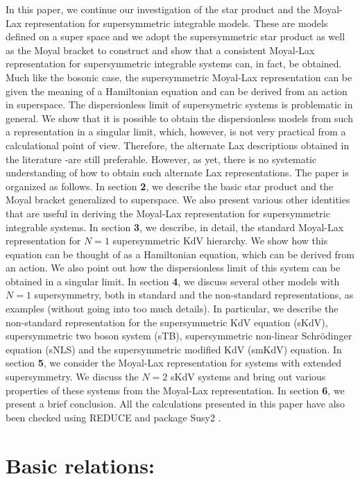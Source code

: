 \documentclass[a4paper,11pt]{article}
\begin{document}
In this paper, we continue our investigation of the star product and
the Moyal-Lax representation for supersymmetric integrable
models. These are models defined on a super space \cite{14} and we adopt the
supersymmetric star product \cite{15} as well as the Moyal bracket to
construct and show that a consistent Moyal-Lax representation for
supersymmetric
integrable systems can, in fact, be obtained. Much like the bosonic
case, the supersymmetric Moyal-Lax representation can be given the
meaning of a Hamiltonian equation and can be derived from an action in
superspace. The dispersionless limit of supersymetric systems is
problematic in general. We show that it is possible to obtain the
dispersionless models from such a representation in a singular limit,
which, however, is not very practical from a calculational point of
view. Therefore, the alternate Lax descriptions obtained in the
literature \cite{16}-\cite{17}are still preferable. However, as yet,
there  is no
systematic understanding of how to obtain such alternate Lax
representations. The paper is organized as follows. In section {\bf
2}, we describe the basic star product and the Moyal bracket
generalized to superspace. We also present various other identities
that are useful in deriving the Moyal-Lax representation for
supersymmetric integrable systems. In section {\bf 3}, we describe, in
detail, the standard Moyal-Lax representation for $N=1$ supersymmetric
KdV hierarchy. We show how this equation can be thought of as a
Hamiltonian equation, which can be derived from an action. We also
point out how the dispersionless limit of this system can be obtained
in a singular limit. In section {\bf 4}, we discuss several other
models with $N=1$ supersymmetry, both in standard and the non-standard
representations, as examples
(without going into too much details). In particular, we describe the
non-standard representation for the supersymmetric KdV equation (sKdV),
supersymmetric two boson system (sTB), supersymmetric non-linear
Schr\"{o}dinger equation (sNLS) and the supersymmetric modified KdV (smKdV)
equation.  In section {\bf 5}, we consider the
Moyal-Lax representation for systems with extended supersymmetry. We
discuss the $N=2$ sKdV systems and bring out various properties of
these  systems from  the Moyal-Lax representation. In section {\bf 6},
we present a brief conclusion. All the calculations presented in this
paper have also been checked using REDUCE \cite{21} and package Susy2
\cite {22}.

\section{Basic relations:}
\end{document}
